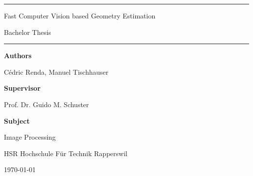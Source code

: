 \documentclass[a4paper,12pt]{book}
\begin{document}
\pagestyle{fancy}
\lhead{}
\rhead{}
\frontmatter
\newcommand\HRule{\noindent\rule{\linewidth}{1.5pt}}



\hypersetup{
	colorlinks=true,
	linktoc=all,
	linkcolor=blue
}


\newtheorem{satz}{Theorem}[chapter]
\newtheorem{problem}[satz]{Problem}
\newtheorem{hilfssatz}[satz]{Lemma}
\newtheorem{definition}[satz]{Definition}
\newtheorem{annahme}[satz]{Assumption}
\newtheorem{aufgabe}[satz]{Task}
\newenvironment{beispiel}[1][Example]{%
	\begin{proof}[#1]%
		\renewcommand{\qedsymbol}{$\bigcirc$}
	}{\end{proof}}


\begin{titlepage}
\HRule
\vspace*{10pt}
\begin{flushright}
{\LARGE
Fast Computer Vision based Geometry Estimation}

\end{flushright}
\begin{flushright}
{\Large Bachelor Thesis}
\end{flushright}
\HRule

\vspace{70pt}
\large
\textbf{Authors}

Cédric Renda, Manuel Tischhauser

\textbf{Supervisor}

Prof. Dr. Guido M. Schuster 

\textbf{Subject}

Image Processing



\begin{center}
HSR Hochschule Für Technik Rapperswil

\today
\end{center}
\end{titlepage}



\tableofcontents

\mainmatter







\end{document}
